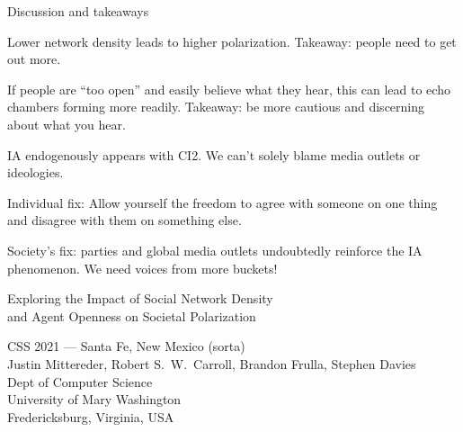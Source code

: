 \documentclass[12pt]{beamer}
\begin{document}
\begin{frame}[c]{Discussion and takeaways}  %

Lower network density leads to higher polarization. Takeaway: people need to
get out more.


\pause
If people are ``too open'' and easily believe what they hear, this can lead to
echo chambers forming more readily. Takeaway: be more cautious and discerning
about what you hear.

\pause
IA endogenously appears with CI2. We can't solely blame media outlets or
ideologies.

\pause
Individual fix: Allow yourself the freedom to agree with someone on one thing
and disagree with them on something else.

\pause
Society's fix: parties and global media outlets undoubtedly reinforce the IA
phenomenon. We need voices from more buckets!

\end{frame}

\begin{frame}[c]{}

\begin{center}
\Large
Exploring the Impact of Social Network Density\\and Agent Openness on Societal Polarization

\footnotesize
\vspace{.3in}
CSS 2021 --- Santa Fe, New Mexico (sorta)\\
\vspace{.1in}
Justin Mittereder, Robert S.~W.~Carroll, Brandon Frulla, Stephen Davies\\
\smallskip
\scriptsize
Dept of Computer Science\\
University of Mary Washington\\
Fredericksburg, Virginia, USA\\
\end{center}

\end{frame}
\end{document}

